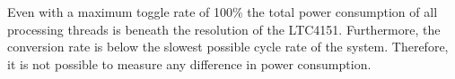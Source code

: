 Even with a maximum toggle rate of 100\% the total power consumption of all
processing threads is beneath the resolution of the LTC4151. Furthermore, the
conversion rate is below the slowest possible cycle rate of the system.
Therefore, it is not possible to measure any difference in power consumption.